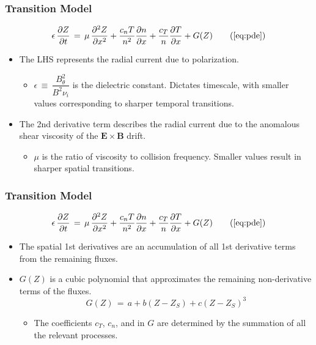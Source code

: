\documentclass{beamer}
\begin{document}
\begin{frame}
\frametitle{Transition Model}
\begin{equation}
	\epsilon\,\frac{\partial Z}{\partial t} \,=\, \mu\,\frac{\partial^2 Z}{\partial x^2} + \frac{c_n T}{n^2} \frac{\partial n}{\partial x} + \frac{c_T}{n} \frac{\partial T}{\partial x} + G(Z) \tag{\ref{eq:pde}}
\end{equation}
	\begin{itemize}
		\item The LHS represents the radial current due to polarization.
		\begin{itemize}
			\item $\epsilon \,\equiv\, \dfrac{B_\theta^2}{B^2 \nu_i}$ is the dielectric constant.
			Dictates timescale, with smaller values corresponding to sharper temporal transitions.
		\end{itemize}
		\item The 2nd derivative term describes the radial current due to the anomalous shear viscosity of the $\mathbf{E}\times\mathbf{B}$ drift.
		\begin{itemize}
			\item $\mu$ is the ratio of viscosity to collision frequency. Smaller values result in sharper spatial transitions.
		\end{itemize}
	\end{itemize}
\end{frame}

\begin{frame}
\frametitle{Transition Model}
\begin{equation}
	\epsilon\,\frac{\partial Z}{\partial t} \,=\, \mu\,\frac{\partial^2 Z}{\partial x^2} + \frac{c_n T}{n^2} \frac{\partial n}{\partial x} + \frac{c_T}{n} \frac{\partial T}{\partial x} + G(Z) \tag{\ref{eq:pde}}
\end{equation}
	\begin{itemize}
		\item The spatial 1st derivatives are an accumulation of all 1st derivative terms from the remaining fluxes.
		\item $G(Z)$ is a cubic polynomial that approximates the remaining non-derivative terms of the fluxes.
		\begin{equation}
			G(Z) \,=\, a + b(Z - Z_S) + c(Z - Z_S)^3
			\label{eq:G_func}
		\end{equation}
		\begin{itemize}
			\item The coefficients $c_T$, $c_n$, and in $G$ are determined by the summation of all the relevant processes.
		\end{itemize}
	\end{itemize}
\end{frame}
\end{document}
